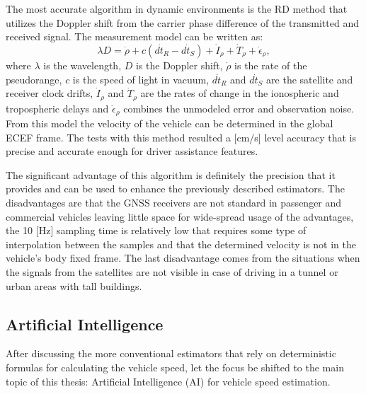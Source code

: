 The most accurate algorithm in dynamic environments is the RD method that utilizes the Doppler shift from the carrier phase difference of the transmitted and received signal. The measurement model can be written as:
\begin{equation}
    \lambda D = \dot \rho + c(d \dot t_R - d \dot t_S) + \dot I_{\rho} + \dot T_{\rho} + \dot \epsilon_{\rho},
\end{equation}
where $\lambda$ is the wavelength, $D$ is the Doppler shift, $\dot\rho$ is the rate of the pseudorange, $c$ is the speed of light in vacuum, $d\dot t_R$ and $d\dot t_S$ are the satellite and receiver clock drifts, $\dot I_{\rho}$ and $\dot T_{\rho}$ are the rates of change in the ionospheric and tropospheric delays and $\dot \epsilon_{\rho}$ combines the unmodeled error and observation noise. From this model the velocity of the vehicle can be determined in the global ECEF frame. The tests with this method resulted a [cm/s] level accuracy that is precise and accurate enough for driver assistance features. 

The significant advantage of this algorithm is definitely the precision that it provides and can be used to enhance the previously described estimators. The disadvantages are that the GNSS receivers are not standard in passenger and commercial vehicles leaving little space for wide-spread usage of the advantages, the 10 [Hz] sampling time is relatively low that requires some type of interpolation between the samples and that the determined velocity is not in the vehicle's body fixed frame. The last disadvantage comes from the situations when the signals from the satellites are not visible in case of driving in a tunnel or urban areas with tall buildings. 


\subsection{Artificial Intelligence}
After discussing the more conventional estimators that rely on deterministic formulas for calculating the vehicle speed, let the focus be shifted to the main topic of this thesis: Artificial Intelligence (AI) for vehicle speed estimation. 

